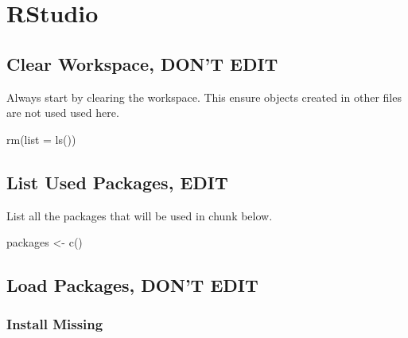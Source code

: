 \documentclass[
  letterpaper,
  DIV=11,
  numbers=noendperiod]{scrreprt}
\newenvironment{Shaded}{\begin{snugshade}}{\end{snugshade}}
\newcommand{\AttributeTok}[1]{\textcolor[rgb]{0.40,0.45,0.13}{#1}}
\newcommand{\FunctionTok}[1]{\textcolor[rgb]{0.28,0.35,0.67}{#1}}
\newcommand{\NormalTok}[1]{\textcolor[rgb]{0.00,0.23,0.31}{#1}}
\newcommand{\OtherTok}[1]{\textcolor[rgb]{0.00,0.23,0.31}{#1}}
\begin{document}
\chapter{RStudio}\label{rstudio}

\section*{Clear Workspace, DON'T
EDIT}\label{clear-workspace-dont-edit-2}


Always start by clearing the workspace. This ensure objects created in
other files are not used used here.

\begin{Shaded}
\begin{Highlighting}[]
\FunctionTok{rm}\NormalTok{(}\AttributeTok{list =} \FunctionTok{ls}\NormalTok{())}
\end{Highlighting}
\end{Shaded}

\section*{List Used Packages, EDIT}\label{list-used-packages-edit-2}


List all the packages that will be used in chunk below.

\begin{Shaded}
\begin{Highlighting}[]
\NormalTok{packages }\OtherTok{\textless{}{-}} \FunctionTok{c}\NormalTok{()}
\end{Highlighting}
\end{Shaded}

\section*{Load Packages, DON'T EDIT}\label{sec-packages}


\subsection*{Install Missing}\label{install-missing-2}
\end{document}

